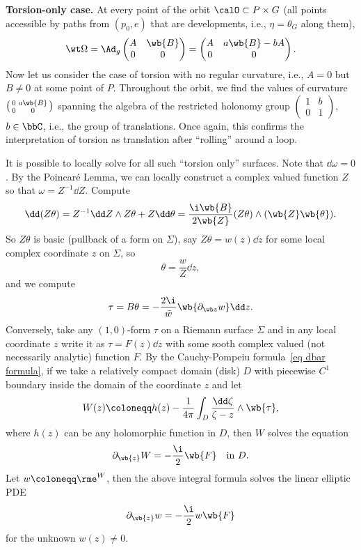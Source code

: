\textbf{Torsion-only case.} At every point of the orbit $\calO\subset P\times G$ (all points accessible by paths from $(p_0,e)$ that are developments, i.e., $\eta=\theta_G$ along them), 
\[\wt\Omega=\Ad_g \begin{pmatrix}
    A & \wb{B} \\ 0 & 0
\end{pmatrix}=
\begin{pmatrix}
    A & a\wb{B}-bA\\ 0 & 0
\end{pmatrix}.
\]
Now let us consider the case of torsion with no regular curvature, i.e., $A=0$ but $B\neq 0$ at some point of $P$. Throughout the orbit, we find the values of curvature $\left(\begin{smallmatrix}
    0 & a\wb{B} \\ 0 & 0
\end{smallmatrix}\right)$ spanning the algebra of the restricted holonomy group $\left(\begin{smallmatrix}
    1 & b\\ 0 & 1
\end{smallmatrix}\right)$, $b\in \bbC$, i.e., the group of translations. Once again, this confirms the interpretation of torsion as translation after ``rolling'' around a loop.

It is possible to locally solve for all such ``torsion only'' surfaces. Note that $\dd\omega=0$. By the Poincar\'e Lemma, we can locally construct a complex valued function $Z$ so that $\omega=Z^{-1}\dd Z$. Compute 
\[\dd (Z\theta)=Z^{-1}\dd Z\wedge Z\theta+Z \dd\theta=\frac{\i \wb{B}}{2\wb{Z}}(Z\theta)\wedge(\wb{Z}\wb{\theta}).\]
So $Z\theta$ is basic (pullback of a form on $\varSigma$), say $Z\theta=w(z)\dd z$ for some local complex coordinate $z$ on $\varSigma$, so 
\[\theta=\frac{w}{Z}\dd z,\]
and we compute 
\[\tau=B\theta=-\frac{2\i}{\bar{w}}\wb{\partial_{\wb z}w}\dd z.\]
Conversely, take any $(1,0)$-form $\tau$ on a Riemann surface $\varSigma$ and in any local coordinate $z$ write it as $\tau =F(z)\dd z$ with some sooth complex valued (not necessarily analytic) function $F$. By the Cauchy-Pompeiu formula~\ref{eq dbar formula}, if we take a relatively compact domain (disk) $D$ with piecewise $C^1$ boundary inside the domain of the coordinate $z$ and let 
\[W(z)\coloneqq h(z)-\frac{1}{4\pi}\int_D \frac{\dd \zeta}{\zeta-z}\wedge\wb{\tau},\]
where $h(z)$ can be any holomorphic function in $D$, then $W$ solves the equation 
\[\partial_{\wb{z}}W=-\frac{\i}{2} \wb{F} \quad \text{in }D.\]
Let $w\coloneqq \rme^W$, then the above integral formula solves the linear elliptic PDE 
\[\partial_{\wb{z}}w=-\frac{\i}{2}w\wb{F}\]
for the unknown $w(z)\neq 0$.

